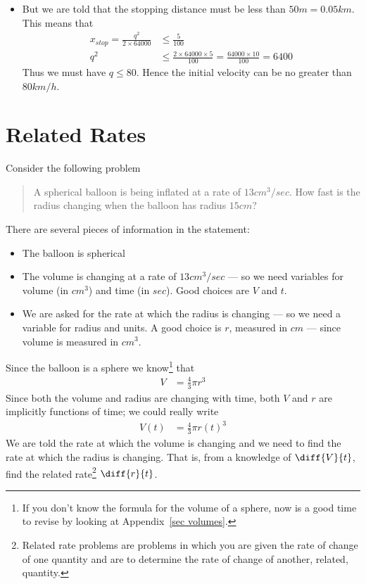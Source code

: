 \begin{eg}
\begin{itemize}
\item But we are told that the stopping distance must be less than $50m = 0.05km$. This
means that
\begin{align*}
  x_{stop} = \frac{q^2}{2 \times 64000} &\leq \frac{5}{100}  \\
    q^2 &\leq \frac{2 \times 64000 \times 5}{100} = \frac{64000 \times 10}{100} = 6400
\end{align*}
Thus we must have $q \leq 80$. Hence the initial velocity can be no greater than $80km/h$.
\end{itemize}

\end{eg}

\section{Related Rates}\label{sec rrates}

Consider the following problem
\begin{quote}
 A spherical balloon is being inflated at a rate of $13cm^3/sec$. How fast is
the radius changing when the balloon has radius $15cm$?
\end{quote}
There are several pieces of information in the statement:
\begin{itemize}
 \item The balloon is spherical
 \item The volume is changing at a rate of $13cm^3/sec$ --- so we need variables
for volume (in $cm^3$) and time (in $sec$). Good choices are $V$ and $t$.
\item We are asked for the rate at which the radius is changing --- so we need
a variable for radius and units. A good choice is $r$, measured in $cm$ ---
since volume is measured in $cm^3$.
\end{itemize}
Since the balloon is a sphere we know\footnote{If you don't know the formula
for the volume of a sphere, now is a good time to revise by looking at
Appendix~\ref{sec volumes}.} that
\begin{align*}
  V &= \frac{4}{3} \pi r^3
\end{align*}
Since both the volume and radius are changing with time, both $V$ and $r$ are
implicitly functions of time; we could really write
\begin{align*}
  V(t) &= \frac{4}{3}\pi r(t)^3
\end{align*}
We are told the rate at which the volume is changing and we need to find the
rate at which the radius is changing. That is, from a knowledge of
$\diff{V}{t}$, find the related rate\footnote{Related rate problems are problems in which
you are given the rate of change of one quantity and are to determine the rate of
change of another, related, quantity.} $\diff{r}{t}$.

